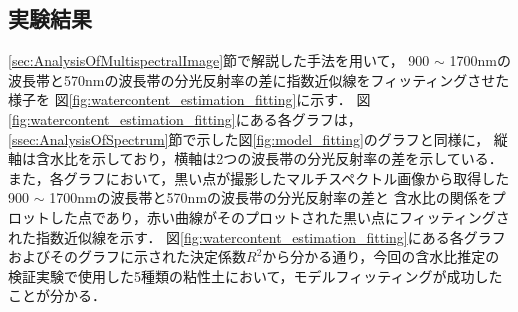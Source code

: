 \clearpage


\subsection{実験結果}
\label{ssec:EstimationResult}

\ref{sec:AnalysisOfMultispectralImage}節で解説した手法を用いて，
900 $\sim$ 1700nmの波長帯と570nmの波長帯の分光反射率の差に指数近似線をフィッティングさせた様子を
図\ref{fig:watercontent_estimation_fitting}に示す．
図\ref{fig:watercontent_estimation_fitting}にある各グラフは，\ref{ssec:AnalysisOfSpectrum}節で示した図\ref{fig:model_fitting}のグラフと同様に，
縦軸は含水比を示しており，横軸は2つの波長帯の分光反射率の差を示している．
また，各グラフにおいて，黒い点が撮影したマルチスペクトル画像から取得した900 $\sim$ 1700nmの波長帯と570nmの波長帯の分光反射率の差と
含水比の関係をプロットした点であり，赤い曲線がそのプロットされた黒い点にフィッティングされた指数近似線を示す．
図\ref{fig:watercontent_estimation_fitting}にある各グラフおよびそのグラフに示された決定係数$R^2$から分かる通り，今回の含水比推定の検証実験で使用した5種類の粘性土において，モデルフィッティングが成功したことが分かる．

